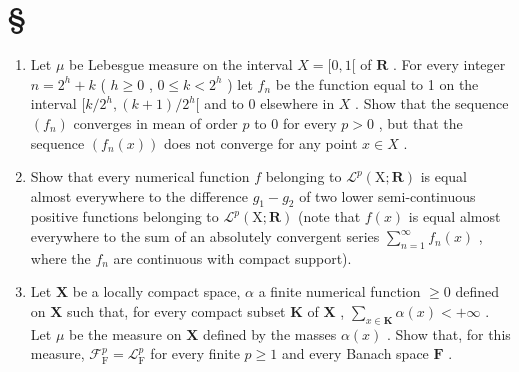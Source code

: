 \section*{\texorpdfstring{\S\CurrentExerciseGroup}{Section \CurrentExerciseGroup}}
{}

\begin{enumerate}
\def\labelenumi{\arabic{enumi})}
\item
  Let \(\mu\) be Lebesgue measure on the interval \(X = [0,1[\) of \(\mathbf{R}\) . For every integer \(n = 2^h + k\) ( \(h \geqslant 0\) , \(0 \leqslant k < 2^h\) ) let \(f_n\) be the function equal to 1 on the interval \([k/2^h, (k+1)/2^h[\) and to 0 elsewhere in \(X\) . Show that the sequence \((f_n)\) converges in mean of order \(p\) to 0 for every \(p > 0\) , but that the sequence \((f_n(x))\) does not converge for any point \(x \in X\) .
\item
  Show that every numerical function \(f\) belonging to \(\mathcal{L}^p(\mathrm{X};\mathbf{R})\) is equal almost everywhere to the difference \(g_1 - g_2\) of two lower semi-continuous positive functions belonging to \(\mathcal{L}^p(\mathrm{X};\mathbf{R})\) (note that \(f(x)\) is equal almost everywhere to the sum of an absolutely convergent series \(\sum_{n=1}^{\infty} f_n(x)\) , where the \(f_n\) are continuous with compact support).
\item
  Let \(\mathbf{X}\) be a locally compact space, \(\alpha\) a finite numerical function \(\geqslant 0\) defined on \(\mathbf{X}\) such that, for every compact subset \(\mathbf{K}\) of \(\mathbf{X}\) , \(\sum_{x\in \mathbf{K}}\alpha (x) < +\infty\) . Let \(\mu\) be the measure on \(\mathbf{X}\) defined by the masses \(\alpha (x)\) . Show that, for this measure, \(\mathcal{F}_{\mathrm{F}}^{p} = \mathcal{L}_{\mathrm{F}}^{p}\) for every finite \(p\geqslant 1\) and every Banach space \(\mathbf{F}\) .
\end{enumerate}

\setcounter{exercisegroup}{4}
\edef\CurrentExerciseGroup{\arabic{exercisegroup}}
